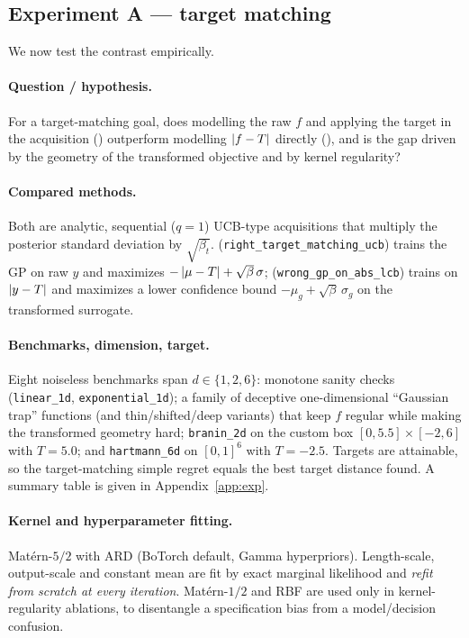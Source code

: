 \subsection{Experiment A --- target matching}
\label{sec:contrib-tm-exp}

We now test the contrast empirically. \hfill\Pexp

\paragraph{Question / hypothesis.}
For a target-matching goal, does modelling the raw $f$ and applying the target in
the acquisition (\RIGHT) outperform modelling $\left\lvert f-T\right\rvert$ directly (\WRONG),
and is the gap driven by the geometry of the transformed objective and by kernel
regularity?

\paragraph{Compared methods.}
Both are analytic, sequential ($q=1$) UCB-type acquisitions that multiply the
posterior standard deviation by $\sqrt{\beta_t}$. \RIGHT{}
(\texttt{right\_target\_matching\_ucb}) trains the GP on raw $y$ and maximizes
$-\left\lvert \mu-T\right\rvert+\sqrt{\beta}\,\sigma$; \WRONG{} (\texttt{wrong\_gp\_on\_abs\_lcb})
trains on $\left\lvert y-T\right\rvert$ and maximizes a lower confidence bound
$-\mu_g+\sqrt{\beta}\,\sigma_g$ on the transformed surrogate.

\paragraph{Benchmarks, dimension, target.}
Eight noiseless benchmarks span $d\in\{1,2,6\}$: monotone sanity checks
(\texttt{linear\_1d}, \texttt{exponential\_1d}); a family of deceptive
one-dimensional ``Gaussian trap'' functions (and thin/shifted/deep variants) that
keep $f$ regular while making the transformed geometry hard;
\texttt{branin\_2d} on the custom box $[0,5.5]\times[-2,6]$ with $T=5.0$; and
\texttt{hartmann\_6d} on $[0,1]^6$ with $T=-2.5$. Targets are attainable, so the
target-matching simple regret equals the best target distance found. A summary
table is given in Appendix~\ref{app:exp}.

\paragraph{Kernel and hyperparameter fitting.}
Mat\'ern-$5/2$ with ARD (BoTorch default, Gamma hyperpriors). Length-scale,
output-scale and constant mean are fit by exact marginal likelihood and
\emph{refit from scratch at every iteration}. Mat\'ern-$1/2$ and RBF are used
only in kernel-regularity ablations, to disentangle a specification bias from a
model/decision confusion.

